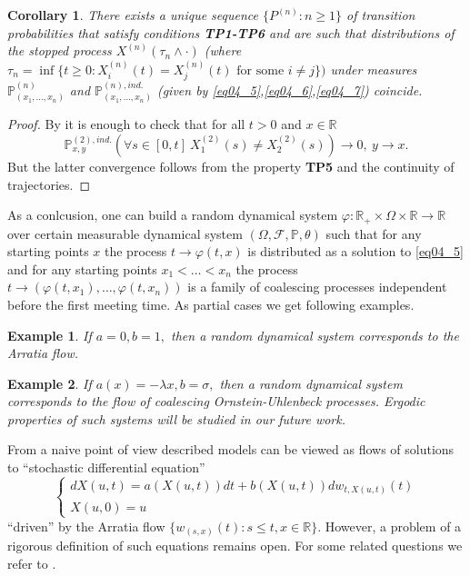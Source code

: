 \documentclass[a4paper,12pt]{article}
\newcommand{\1}{1\!\!\,{\rm I}}
\theoremstyle{plain}
\newtheorem{example}{Example}[section]
\newtheorem{corollary}{Corollary}[section]
\begin{document}
\begin{corollary}\label{cor29_01} There exists a unique sequence $\{P^{(n)}:n\geq 1\}$ of transition probabilities that satisfy conditions {\bf TP1-TP6} and are such that distributions of the stopped process   $X^{(n)}(\tau_n\wedge \cdot)$ (where $\tau_n=\inf\{t\geq 0: X^{(n)}_i(t)=X^{(n)}_j(t) \mbox{ for some } i\ne j\})$ under measures $\mathbb{P}^{(n)}_{(x_1,\ldots,x_n)}$ and $\mathbb{P}^{(n),ind.}_{(x_1,\ldots,x_n)}$ (given by \eqref{eq04_5},\eqref{eq04_6},\eqref{eq04_7}) coincide. 
\end{corollary}
\begin{proof} By  \cite[Th. 4.1]{LJR} it is enough to check that for all $t>0$ and $x\in\mathbb{R}$
	$$
	\mathbb{P}^{(2),ind.}_{x,y}(\forall s\in[0,t] \ X^{(2)}_1(s)\ne X^{(2)}_2(s))\to 0, \ y\to x.
	$$
	But the latter convergence follows from the property {\bf TP5} and the continuity of trajectories.
	
	
\end{proof}

As a conlcusion, one can build a random dynamical system $\varphi:\mathbb{R}_+\times\Omega\times \mathbb{R}\to \mathbb{R}$ over certain measurable dynamical system $(\Omega,\mathcal{F},\mathbb{P},\theta)$ such that for any starting points $x$ the process $t\to \varphi(t,x)$ is distributed as a solution to \eqref{eq04_5} and for any starting points $x_1<\ldots<x_n$ the process $t\to (\varphi(t,x_1),\ldots,\varphi(t,x_n))$ is a family of coalescing processes independent before the first meeting time. As partial cases we get following examples.

\begin{example}\label{ex29_1}
	If $a=0, b=1,$ then a random dynamical system corresponds to the Arratia flow.
\end{example}

\begin{example}\label{ex29_2}
	If $a(x)=-\lambda x, b=\sigma,$ then a random dynamical system corresponds to the flow of coalescing Ornstein-Uhlenbeck processes. Ergodic properties of such systems will be studied in our future work.
\end{example}


From a naive point of view described models can be viewed as flows of solutions to ``stochastic differential equation''
$$
\begin{cases}
dX(u,t)=a(X(u,t))dt+b(X(u,t))dw_{t,X(u,t)}(t) \\
X(u,0)=u
\end{cases}
$$ ``driven'' by the Arratia flow $\{w_{(s,x)}(t):s\leq t, x\in\mathbb{R}\}$. However, a problem of a rigorous definition of such equations remains open. For some related questions we refer to \cite{DVovch}.
\end{document}
